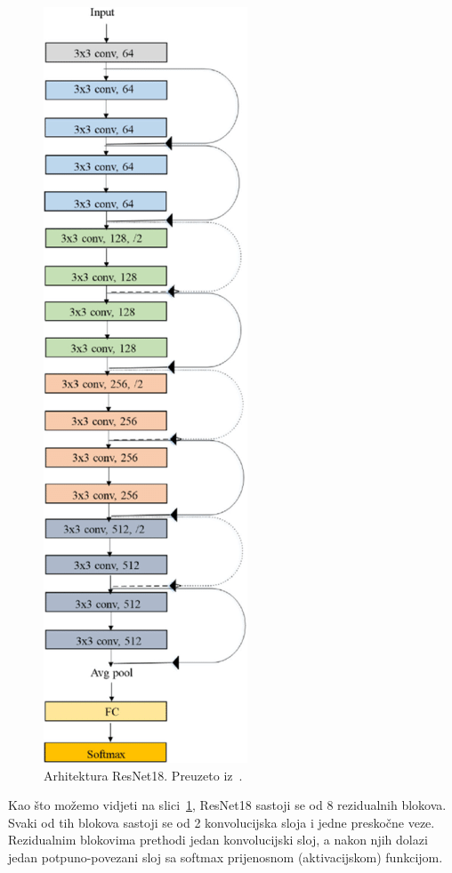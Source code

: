 \documentclass[times, utf8, zavrsni, numeric]{fer}
\begin{document}
\begin{figure}[htb]
    \centering
    \includegraphics[scale=0.7]{resnet18.png}
    \caption{Arhitektura ResNet18. Preuzeto iz~\cite{mcc19}.}
    \label{fig:resnet18}
\end{figure}

Kao što možemo vidjeti na slici~\ref{fig:resnet18}, ResNet18 sastoji se od 8 rezidualnih blokova. Svaki od tih blokova sastoji se od 2 konvolucijska sloja i jedne preskočne veze.
Rezidualnim blokovima prethodi jedan konvolucijski sloj, a nakon njih dolazi jedan potpuno-povezani sloj sa softmax prijenosnom (aktivacijskom) funkcijom.
\end{document}
